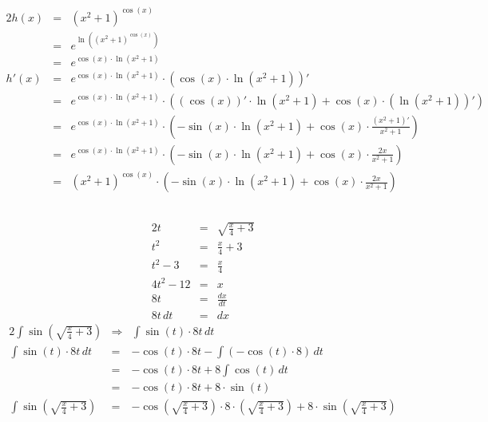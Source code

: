\documentclass[10pt,a4paper,oneside,ngerman,numbers=noenddot]{scrartcl}
\begin{document}
\section{} %
\subsection{} %
\begin{alignat*}{2}
h(x) &=& (x^{2}+1)^{\cos(x)} \\
&=& e^{\ln \left((x^{2}+1)^{\cos(x)}\right)}\\
&=& e^{\cos(x) \cdot \ln (x^{2}+1)} \\
h'(x) &=& e^{\cos(x) \cdot \ln (x^{2}+1)} \cdot \left(\cos(x) \cdot \ln (x^{2}+1)\right)' \\
&=& e^{\cos(x) \cdot \ln (x^{2}+1)} \cdot \left((\cos(x))' \cdot \ln (x^{2}+1) + \cos(x) \cdot (\ln (x^{2}+1))'\right) \\
&=& e^{\cos(x) \cdot \ln (x^{2}+1)} \cdot \left(-\sin(x) \cdot \ln (x^{2}+1) + \cos(x) \cdot \frac{(x^{2}+1)'}{x^{2}+1}\right) \\
&=& e^{\cos(x) \cdot \ln (x^{2}+1)} \cdot \left(-\sin(x) \cdot \ln (x^{2}+1) + \cos(x) \cdot \frac{2x}{x^{2}+1}\right) \\
&=& (x^{2}+1)^{\cos(x)} \cdot \left(-\sin(x) \cdot \ln (x^{2}+1) + \cos(x) \cdot \frac{2x}{x^{2}+1}\right)
\end{alignat*}
\subsection{} %
\begin{alignat*}{2}
t &=& \sqrt{\frac{x}{4} + 3} \\
t^{2} &=& \frac{x}{4} + 3 \\
t^{2} - 3 &=& \frac{x}{4} \\
4t^{2} - 12 &=& x \\
8t &=& \frac{dx}{dt} \\
8t\,dt &=& dx
\end{alignat*}
\begin{alignat*}{2}
\int \sin \left(\sqrt{\frac{x}{4} + 3}\right) &\Rightarrow & \int \sin (t) \cdot 8t\,dt \\
\int \sin (t) \cdot 8t\,dt &=& -\cos(t) \cdot 8t - \int (-\cos (t) \cdot 8)\,dt \\
&=& -\cos(t) \cdot 8t + 8\int \cos(t)\,dt \\
&=& -\cos(t) \cdot 8t + 8 \cdot \sin(t) \\
\int \sin \left(\sqrt{\frac{x}{4} + 3}\right) &=& -\cos \left(\sqrt{\frac{x}{4} + 3} \right) \cdot 8 \cdot \left(\sqrt{\frac{x}{4} + 3} \right) + 8 \cdot \sin \left(\sqrt{\frac{x}{4} + 3}\right)
\end{alignat*}
\end{document}
